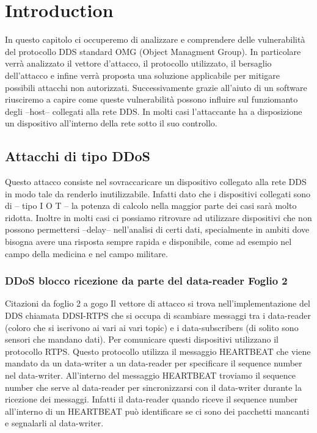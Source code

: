 \chapter{Introduction}


In questo capitolo ci occuperemo di analizzare e comprendere delle vulnerabilità
del protocollo DDS standard OMG (Object Managment Group). In particolare
verrà analizzato il vettore d'attacco, il protocollo utilizzato, il bersaglio
dell'attacco e infine verrà proposta una soluzione applicabile per
mitigare possibili attacchi non autorizzati. Successivamente grazie all'aiuto 
di un software riusciremo a capire come queste vulnerabilità possono 
influire sul funziomanto degli --host-- collegati alla rete DDS. In molti casi
l'attaccante ha a disposizione un dispositivo all'interno della rete sotto
il suo controllo.


\section{Attacchi di tipo DDoS}
Questo attacco consiste nel sovraccaricare un dispositivo collegato alla rete DDS
in modo tale da renderlo inutilizzabile. Infatti dato che i dispositivi collegati
sono di -- tipo I O T -- la potenza di calcolo nella maggior parte dei casi sarà
molto ridotta. Inoltre in molti casi ci possiamo ritrovare ad utilizzare dispositivi
che non possono permettersi --delay-- nell'analisi di certi dati, specialmente in
ambiti dove bisogna avere una risposta sempre rapida e disponibile, come ad esempio
nel campo della medicina e nel campo militare.


\subsection{DDoS blocco ricezione da parte del data-reader Foglio 2}

Citazioni da foglio 2 a gogo
Il vettore di attacco si trova nell'implementazione del DDS chiamata DDSI-RTPS che
si occupa di scambiare messaggi tra i data-reader (coloro che si iscrivono ai vari
ai vari topic) e i data-subscribers (di solito sono sensori che mandano dati). Per
comunicare questi dispositivi utilizzano il protocollo RTPS. 
Questo protocollo utilizza il messaggio HEARTBEAT che viene mandato da un data-writer 
a un data-reader per specificare il sequence number nel data-writer.
All'interno del messaggio HEARTBEAT troviamo il sequence number che serve al 
data-reader per sincronizzarsi con il data-writer durante la ricezione dei messaggi. 
Infatti il data-reader quando riceve il sequence number all'interno di un HEARTBEAT
può identificare se ci sono dei pacchetti mancanti e segnalarli al
data-writer.

